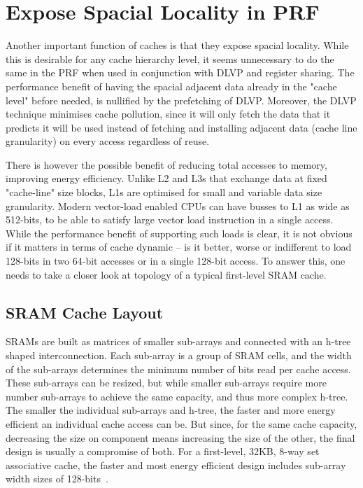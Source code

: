 \documentclass{sig-alternate}
\begin{document}
\section{Expose Spacial Locality in PRF}
Another important function of caches is that they expose spacial locality. While this is desirable for any cache hierarchy level, it seems unnecessary to do the same in the PRF when used in conjunction with DLVP and register sharing. The performance benefit of having the spacial adjacent data already in the "cache level" before needed, is nullified by the prefetching of DLVP. Moreover, the DLVP technique minimises cache pollution, since it will only fetch the data that it predicts it will be used instead of fetching and installing adjacent data (cache line granularity) on every access regardless of reuse.

There is however the possible benefit of reducing total accesses to memory, improving energy efficiency. Unlike L2 and L3s that exchange data at fixed "cache-line" size blocks, L1s are optimised for small and variable data size granularity. Modern vector-load enabled CPUs can have busses to L1 as wide as 512-bits, to be able to satisfy large vector load instruction in a single access. While the performance benefit of supporting such loads is clear, it is not obvious if it matters in terms of cache dynamic -- is it better, worse or indifferent to load 128-bits in two 64-bit accesses or in a single 128-bit access. To answer this, one needs to take a closer look at topology of a typical first-level SRAM cache. 



\subsection{SRAM Cache Layout}

SRAMs are built as matrices of smaller sub-arrays and connected with an h-tree shaped interconnection. Each sub-array is a group of SRAM cells, and the width of the sub-arrays determines the minimum number of bits read per cache access. These sub-arrays can be resized, but while smaller sub-arrays require more number sub-arrays to achieve the same capacity, and thus more complex h-tree. The smaller the individual sub-arrays and h-tree, the faster and more energy efficient an individual cache access can be. But since, for the same cache capacity, decreasing the size on component means increasing the size of the other, the final design is usually a compromise of both. For a first-level, 32KB, 8-way set associative cache, the faster and most energy efficient design includes sub-array width sizes of 128-bits~\cite{}.
\end{document}
